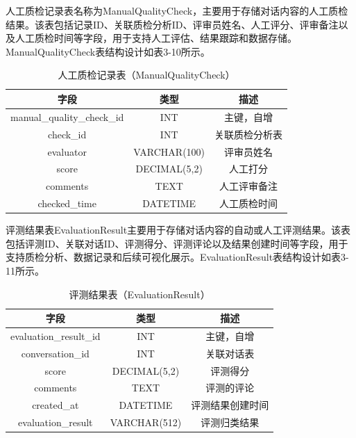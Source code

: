 人工质检记录表名称为ManualQualityCheck，主要用于存储对话内容的人工质检结果。该表包括记录ID、关联质检分析ID、评审员姓名、人工评分、评审备注以及人工质检时间等字段，用于支持人工评估、结果跟踪和数据存储。ManualQualityCheck表结构设计如表3-10所示。
\begin{table}[h!]
\centering
\caption{人工质检记录表（ManualQualityCheck）}
\begin{tabular}{|c|c|c|}
\hline
字段         & 类型          & 描述                        \\
\hline
manual\_quality\_check\_id           & INT           & 主键，自增                  \\
check\_id    & INT           & 关联质检分析表              \\
evaluator    & VARCHAR(100)  & 评审员姓名                  \\
score        & DECIMAL(5,2)  & 人工打分                    \\
comments     & TEXT          & 人工评审备注                \\
checked\_time & DATETIME     & 人工质检时间                \\
\hline
\end{tabular}
\end{table}

评测结果表EvaluationResult主要用于存储对话内容的自动或人工评测结果。该表包括评测ID、关联对话ID、评测得分、评测评论以及结果创建时间等字段，用于支持质检分析、数据记录和后续可视化展示。EvaluationResult表结构设计如表3-11所示。
\begin{table}[h!]
\centering
\caption{评测结果表（EvaluationResult）}
\begin{tabular}{|c|c|c|}
\hline
字段              & 类型         & 描述                    \\
\hline
evaluation\_result\_id                & INT          & 主键，自增              \\
conversation\_id  & INT          & 关联对话表              \\
score             & DECIMAL(5,2) & 评测得分                \\
comments          & TEXT         & 评测的评论              \\
created\_at       & DATETIME     & 评测结果创建时间        \\
evaluation\_result      &VARCHAR(512)    &评测归类结果                \\
\hline
\end{tabular}
\end{table}

